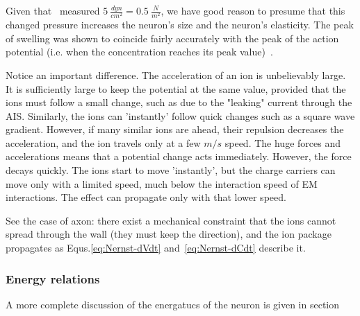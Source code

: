  
 Given that~\cite{PressureChangeActionPotentialMeasured:1980} measured $5\ \frac{dyn}{cm^2} = 0.5\ \frac{N}{m^2}$, we have good reason to presume that this changed pressure increases the neuron's size and the neuron's elasticity.  
The peak of swelling was shown to coincide fairly accurately with the peak of the action potential (i.e. when the concentration reaches its 
peak value)~\cite{RapidMechanicalBiphaseActionPotentialMeasured:1981}.

 Notice an important difference. The acceleration of an ion is unbelievably large. It is sufficiently large to keep the potential at the same value,
 provided that the ions must follow a small change, such as due to the
 "leaking" current through the
 \gls{AIS}.
 Similarly, the ions can 'instantly' follow quick changes such as
 a square wave gradient.
 However, if many similar ions are ahead, their repulsion decreases
 the acceleration, and the ion travels only at a few $m/s$ speed.
 The huge forces and accelerations means that a potential change
 acts immediately. However, the force decays quickly. The ions start to move
 'instantly', but the charge carriers can move only with a limited speed,
 much below the interaction speed of
 \gls{EM}
 interactions. The effect can propagate only with that lower speed.

 See the case of axon: there exist a mechanical constraint that
 the ions cannot spread through the wall (they must keep the direction), and
 the ion package propagates as Equs.\ref{eq:Nernst-dVdt} and~\ref{eq:Nernst-dCdt} describe it.

	

\subsubsection[Energy]{Energy relations\label{sec:Physics-EnergyRelation}}

A more complete discussion of the energatucs of the neuron
is given in section
